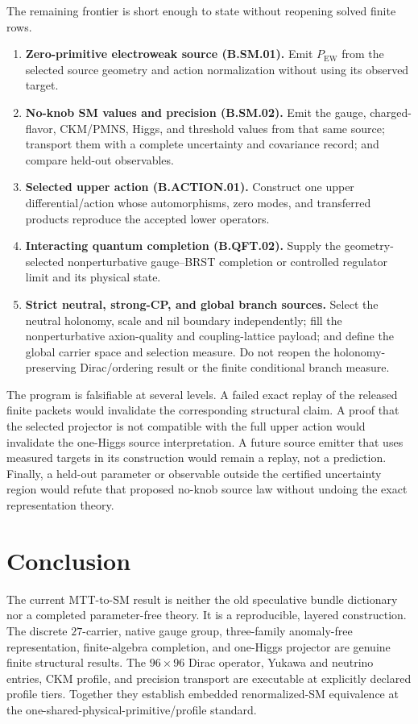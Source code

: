 \documentclass[11pt]{article}
\begin{document}
The remaining frontier is short enough to state without reopening solved finite rows.
\begin{enumerate}
\item \textbf{Zero-primitive electroweak source (B.SM.01).}  Emit $P_{\mathrm{EW}}$ from the
selected source geometry and action normalization without using its observed target.
\item \textbf{No-knob SM values and precision (B.SM.02).}  Emit the gauge, charged-flavor,
CKM/PMNS, Higgs, and threshold values from that same source; transport them with a complete
uncertainty and covariance record; and compare held-out observables.
\item \textbf{Selected upper action (B.ACTION.01).}  Construct one upper differential/action
whose automorphisms, zero modes, and transferred products reproduce the accepted lower operators.
\item \textbf{Interacting quantum completion (B.QFT.02).}  Supply the geometry-selected
nonperturbative gauge--BRST completion or controlled regulator limit and its physical state.
\item \textbf{Strict neutral, strong-CP, and global branch sources.}  Select the neutral holonomy,
scale and nil boundary independently; fill the nonperturbative axion-quality and coupling-lattice
payload; and define the global carrier space and selection measure.  Do not reopen the
holonomy-preserving Dirac/ordering result or the finite conditional branch measure.
\end{enumerate}

The program is falsifiable at several levels.  A failed exact replay of the released finite packets
would invalidate the corresponding structural claim.  A proof that the selected projector is not
compatible with the full upper action would invalidate the one-Higgs source interpretation.  A
future source emitter that uses measured targets in its construction would remain a replay, not a
prediction.  Finally, a held-out parameter or observable outside the certified uncertainty region
would refute that proposed no-knob source law without undoing the exact representation theory.

\section{Conclusion}

The current MTT-to-SM result is neither the old speculative bundle dictionary nor a completed
parameter-free theory.  It is a reproducible, layered construction.  The discrete $27$-carrier,
native gauge group, three-family anomaly-free representation, finite-algebra completion, and
one-Higgs projector are genuine finite structural results.  The $96\times96$ Dirac operator,
Yukawa and neutrino entries, CKM profile, and precision transport are executable at explicitly
declared profile tiers.  Together they establish embedded renormalized-SM equivalence at the
one-shared-physical-primitive/profile standard.
\end{document}
